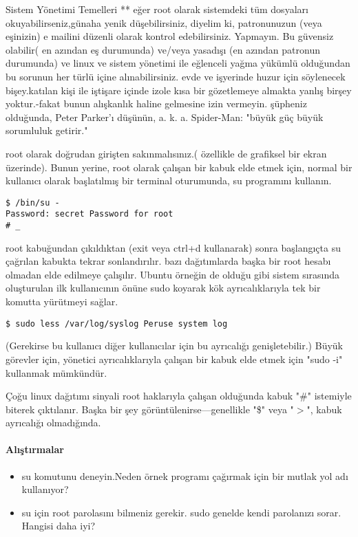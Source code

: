 \begin{section}{Sistem Yönetimi Temelleri}
** eğer root olarak sistemdeki tüm dosyaları okuyabilirseniz,günaha yenik düşebilirsiniz, diyelim ki, patronunuzun (veya eşinizin) e mailini düzenli olarak kontrol edebilirsiniz. Yapmayın. Bu güvensiz olabilir( en azından eş durumunda) ve/veya yasadışı (en azından patronun durumunda) ve linux ve sistem yönetimi ile eğlenceli yağma yükümlü olduğundan bu sorunun her türlü içine alınabilirsiniz. evde ve işyerinde huzur için söylenecek bişey.katılan kişi ile iştişare içinde izole kısa bir gözetlemeye almakta yanlış birşey yoktur.-fakat bunun alışkanlık haline gelmesine izin vermeyin. şüpheniz olduğunda, Peter Parker'ı düşünün, a. k. a. Spider-Man: "büyük güç büyük sorumluluk getirir."

root olarak doğrudan girişten sakınmalısınız.( özellikle de grafiksel bir ekran üzerinde). Bunun yerine, root olarak çalışan bir kabuk elde etmek için, normal bir kullanıcı olarak başlatılmış bir terminal oturumunda, su programını kullanın.
\begin{verbatim}
$ /bin/su -
Password: secret Password for root
# _
\end{verbatim}

root kabuğundan çıkıldıktan (exit veya ctrl+d kullanarak) sonra  başlangıçta su çağrılan kabukta tekrar sonlandırılır. bazı dağıtımlarda başka bir root hesabı olmadan elde edilmeye çalışılır. Ubuntu örneğin de olduğu gibi sistem sırasında oluşturulan ilk kullanıcının önüne sudo koyarak kök ayrıcalıklarıyla tek bir komutta yürütmeyi sağlar.
\begin{verbatim}
$ sudo less /var/log/syslog Peruse system log
\end{verbatim}

(Gerekirse bu kullanıcı diğer kullanıcılar için bu ayrıcalığı genişletebilir.)
Büyük görevler için, yönetici ayrıcalıklarıyla çalışan bir kabuk elde etmek için "sudo -i" kullanmak mümkündür. 

Çoğu linux dağıtımı sinyali root haklarıyla çalışan olduğunda kabuk "\#" istemiyle biterek çıktılanır. Başka bir şey görüntülenirse—genellikle "\$" veya "$>$", kabuk ayrıcalığı olmadığında.

\paragraph{Alıştırmalar}{
\begin{itemize}
 \item su komutunu deneyin.Neden örnek programı çağırmak için bir mutlak yol adı kullanıyor?
 \item su için root parolasını bilmeniz gerekir. sudo genelde kendi parolanızı sorar. Hangisi daha iyi?
\end{itemize}}
\end{section}
